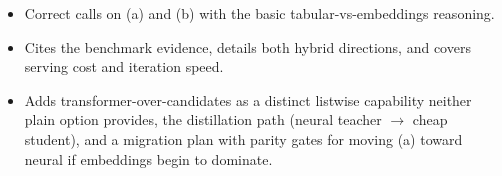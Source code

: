 \begin{interviewq}

\goodgreat
\begin{itemize}
    \item {} Correct calls on (a) and (b) with the basic tabular-vs-embeddings reasoning.
    \item {} Cites the benchmark evidence, details both hybrid directions, and covers serving cost and iteration speed.
    \item {} Adds transformer-over-candidates as a distinct listwise capability neither plain option provides, the distillation path (neural teacher $\rightarrow$ cheap student), and a migration plan with parity gates for moving (a) toward neural if embeddings begin to dominate.
\end{itemize}

\end{interviewq}

